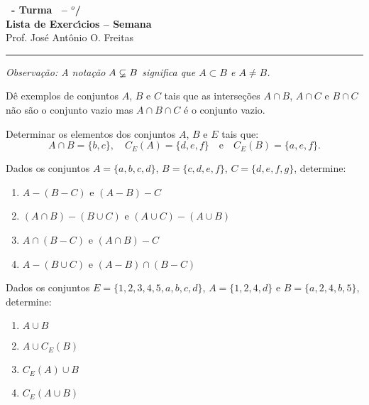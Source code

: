 \documentclass[12pt]{exam}
\begin{document}
    \begin{center}
    {\Large\bf \disciplina\ - Turma \turma\ -- \semestre$^{o}$/\ano} \\ \vspace{9pt} {\large\bf
        Lista de Exerc{\'\i}cios -- Semana \numerosemana}\\ \vspace{9pt} Prof. Jos{\'e} Ant{\^o}nio O. Freitas
    \end{center}
    \hrule

    \vspace{.6cm}

    \begin{center}
        \textit{Observa\c{c}\~ao: A nota\c{c}\~ao $A \varsubsetneq B$ significa que $A \subset B$ e $A \ne B$.}
    \end{center}

    \vspace{.3cm}

    \questao{} Dê exemplos de conjuntos $A$, $B$ e $C$ tais que as interseções $A \cap B$, $A \cap C$ e $B \cap C$ não são o conjunto vazio mas $A \cap B \cap C$ é o conjunto vazio.

    \vspace{.3cm}

    \questao{} Determinar os elementos dos conjuntos $A$, $B$ e $E$ tais que:
\[
    A \cap B = \{b, c\}, \quad C_E(A) = \{d, e, f\} \quad \mbox{e}\quad C_E(B) = \{a, e, f\}.
\]

\vspace{.3cm}

\questao{} Dados os conjuntos $A = \{a, b, c, d\}$, $B = \{c, d, e, f\}$, $C = \{d, e, f, g\}$, determine:
\begin{enumerate}[label={\alph*})]
    \item $A - (B - C)$ e $(A - B) - C$

    \item $(A \cap B) - (B \cup C)$ e $(A \cup C) - (A \cup B)$

    \item $A \cap (B - C)$ e $(A \cap B) - C$

    \item $A - (B \cup C)$ e $(A - B) \cap (B - C)$
\end{enumerate}

\questao{} Dados os conjuntos $E = \{1,2,3,4,5,a,b,c,d\}$, $A = \{1,2,4,d\}$ e $B = \{a,2,4,b,5\}$, determine:
\begin{multicols}{2}
    \begin{enumerate}[label={\alph*})]
        \item $A \cup B$

        \item $A \cup C_E(B)$

        \item $C_E(A) \cup B$

        \item $C_E(A \cup B)$
    \end{enumerate}
\end{multicols}
\end{document}
